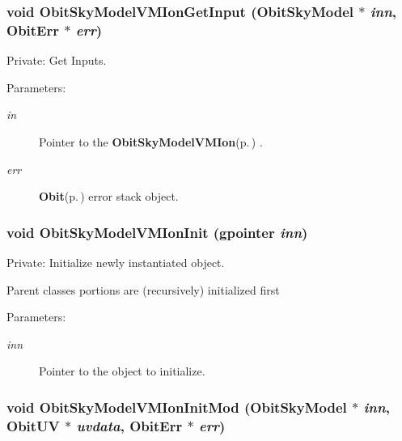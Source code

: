\subsubsection{\setlength{\rightskip}{0pt plus 5cm}void Obit\-Sky\-Model\-VMIon\-Get\-Input ({\bf Obit\-Sky\-Model} $\ast$ {\em inn}, {\bf Obit\-Err} $\ast$ {\em err})}\label{ObitSkyModelVMIon_8c_a6}


Private: Get Inputs. 

\begin{Desc}
\item[Parameters:]
\begin{description}
\item[{\em in}]Pointer to the {\bf Obit\-Sky\-Model\-VMIon}{\rm (p.\,\pageref{structObitSkyModelVMIon})} . \item[{\em err}]{\bf Obit}{\rm (p.\,\pageref{structObit})} error stack object. \end{description}
\end{Desc}
\subsubsection{\setlength{\rightskip}{0pt plus 5cm}void Obit\-Sky\-Model\-VMIon\-Init (gpointer {\em inn})}\label{ObitSkyModelVMIon_8c_a3}


Private: Initialize newly instantiated object. 

Parent classes portions are (recursively) initialized first \begin{Desc}
\item[Parameters:]
\begin{description}
\item[{\em inn}]Pointer to the object to initialize. \end{description}
\end{Desc}
\subsubsection{\setlength{\rightskip}{0pt plus 5cm}void Obit\-Sky\-Model\-VMIon\-Init\-Mod ({\bf Obit\-Sky\-Model} $\ast$ {\em inn}, {\bf Obit\-UV} $\ast$ {\em uvdata}, {\bf Obit\-Err} $\ast$ {\em err})}\label{ObitSkyModelVMIon_8c_a12}


